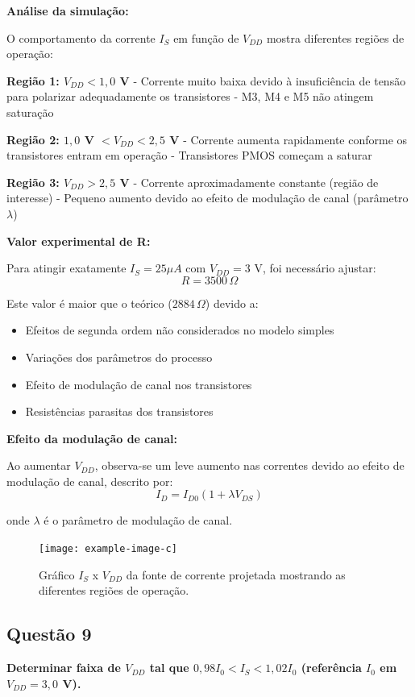 \documentclass[12pt,a4paper]{article}
\begin{document}
\t\textbf{Análise da simulação:}

O comportamento da corrente $I_S$ em função de $V_{DD}$ mostra diferentes regiões de operação:

\t\textbf{Região 1: $V_{DD} < 1,0$ V}
- Corrente muito baixa devido à insuficiência de tensão para polarizar adequadamente os transistores
- M3, M4 e M5 não atingem saturação

\t\textbf{Região 2: $1,0$ V $< V_{DD} < 2,5$ V}
- Corrente aumenta rapidamente conforme os transistores entram em operação
- Transistores PMOS começam a saturar

\t\textbf{Região 3: $V_{DD} > 2,5$ V}
- Corrente aproximadamente constante (região de interesse)
- Pequeno aumento devido ao efeito de modulação de canal (parâmetro $\lambda$)

\t\textbf{Valor experimental de R:}

Para atingir exatamente $I_S = 25 \mu A$ com $V_{DD} = 3$ V, foi necessário ajustar:
$$R = 3500 \, \Omega$$

Este valor é maior que o teórico ($2884 \, \Omega$) devido a:
\begin{itemize}
    \item Efeitos de segunda ordem não considerados no modelo simples
    \item Variações dos parâmetros do processo
    \item Efeito de modulação de canal nos transistores
    \item Resistências parasitas dos transistores
\end{itemize}

\t\textbf{Efeito da modulação de canal:}

Ao aumentar $V_{DD}$, observa-se um leve aumento nas correntes devido ao efeito de modulação de canal, descrito por:
$$I_D = I_{D0}(1 + \lambda V_{DS}) $$

onde $\lambda$ é o parâmetro de modulação de canal.

\begin{figure}[H]
    \centering
    \texttt{[image: example-image-c]}
    \caption{Gráfico $I_S$ x $V_{DD}$ da fonte de corrente projetada mostrando as diferentes regiões de operação.}
    \label{fig:is_vdd}
\end{figure}

\subsection*{Questão 9}
	\textbf{Determinar faixa de $V_{DD}$ tal que $0{,}98 I_0 < I_S < 1{,}02 I_0$ (referência $I_0$ em $V_{DD}=3{,}0$ V).}
\end{document}
